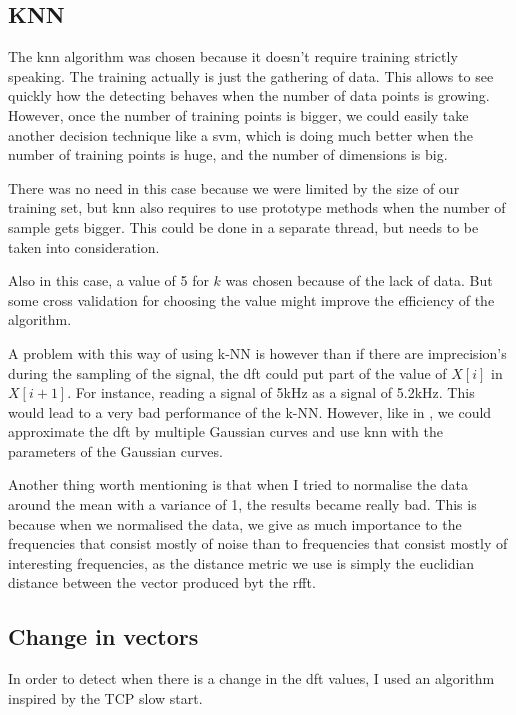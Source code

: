 \subsection{KNN}\label{section:knn}
The \acrshort{knn} algorithm was chosen because it doesn't require training strictly speaking. The training actually is just the gathering of data. This allows to see quickly how the detecting behaves when the number of data points is growing. However, once the number of training points is bigger, we could easily take another decision technique like a \acrshort{svm}, which is doing much better when the number of training points is huge, and the number of dimensions is big.

There was no need in this case because we were limited by the size of our training set, but \acrshort{knn} also requires to use prototype methods when the number of sample gets bigger. This could be done in a separate thread, but needs to be taken into consideration.

Also in this case, a value of 5 for $k$ was chosen because of the lack of data. But some cross validation for choosing the value might improve the efficiency of the algorithm.

A problem with this way of using k-NN is however than if there are imprecision's during the sampling of the signal, the \acrshort{dft} could put part of the value of $X[i]$ in $X[i+1]$. For instance, reading a signal of 5kHz as a signal of 5.2kHz. This would lead to a very bad performance of the k-NN.
However, like in \cite{gupta2010electrisense}, we could approximate the \acrshort{dft} by multiple Gaussian curves and use \acrshort{knn} with the parameters of the Gaussian curves.

Another thing worth mentioning is that when I tried to normalise the data around the mean with a variance of 1, the results became really bad. This is because when we normalised the data, we give as much importance to the frequencies that consist mostly of noise than to frequencies that consist mostly of interesting frequencies, as the distance metric we use is simply the euclidian distance between the vector produced byt the \acrshort{rfft}.


\subsection{Change in vectors}
In order to detect when there is a change in the \acrshort{dft} values, I used an algorithm inspired by the TCP slow start.

